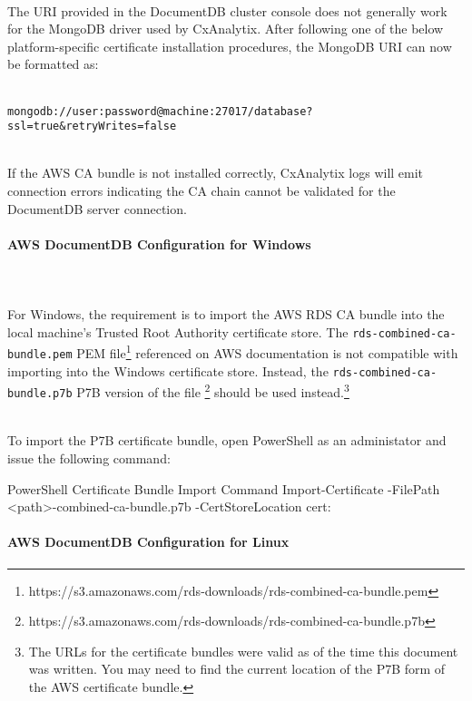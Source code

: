 \noindent\\The URI provided in the DocumentDB cluster console does not
generally work for the MongoDB driver used by CxAnalytix.  After 
following one of the below platform-specific certificate installation
procedures, the MongoDB URI can now be formatted as:

\noindent\\\texttt{mongodb://user:password@machine:27017/database?ssl=true\&retryWrites=false}


\noindent\\If the AWS CA bundle is not installed correctly, CxAnalytix
logs will emit connection errors indicating the CA chain cannot be 
validated for the DocumentDB server connection.


\paragraph{AWS DocumentDB Configuration for Windows}


\noindent\\\\For Windows, the requirement is to import the AWS RDS CA bundle
into the local machine's Trusted Root Authority certificate store.  The 
\texttt{rds-combined-ca-bundle.pem} PEM
file\footnote{https://s3.amazonaws.com/rds-downloads/rds-combined-ca-bundle.pem}
referenced on AWS documentation is not compatible with importing into the
Windows certificate store.  Instead, the \texttt{rds-combined-ca-bundle.p7b} P7B version of the file
\footnote{https://s3.amazonaws.com/rds-downloads/rds-combined-ca-bundle.p7b}
should be used instead.\footnote{The URLs for the certificate bundles 
were valid as of the time this document was written.  You may need to find
the current location of the P7B form of the AWS certificate bundle.}

\noindent\\To import the P7B certificate bundle, open PowerShell as
an administator and issue the following command:\\


\begin{code}{PowerShell Certificate Bundle Import Command}{}{}
Import-Certificate -FilePath <path>\rds-combined-ca-bundle.p7b -CertStoreLocation cert:\LocalMachine\Root
\end{code}



\paragraph{AWS DocumentDB Configuration for Linux}


